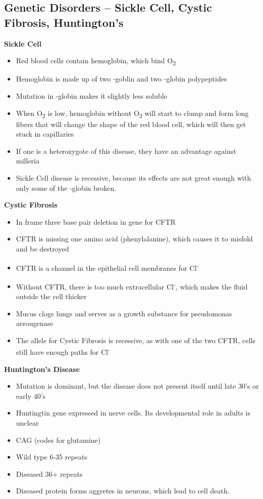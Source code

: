 \documentclass{article}
\begin{document}
\subsection{Genetic Disorders -- Sickle Cell, Cystic Fibrosis, Huntington's}
\textbf{Sickle Cell}
\begin{itemize}
\item Red blood cells contain hemoglobin, which bind O\textsubscript{2}
\item Hemoglobin is made up of two \textalpha -goblin and two \textbeta -globin polypeptides
\item Mutation in \textbeta -globin makes it slightly less soluble
\item When O\textsubscript{2} is low, hemoglobin without O\textsubscript{2} will start to
clump and form long fibers that will change the shape of the red blood cell, which will then get stuck in capillaries
\item If one is a heterozygote of this disease, they have an advantage against milleria
\item Sickle Cell disease is recessive, because its effects are not great enough with only some of the \textbeta -globin broken.
\end{itemize}

\textbf{Cystic Fibrosis}
\begin{itemize}
\item In frame three base pair deletion in gene for CFTR
\item CFTR is missing one amino acid (phenylalanine), which causes it to misfold and be
destroyed
\item CFTR is a channel in the epithelial cell membranes for Cl\textsuperscript{-}
\item Without CFTR, there is too much extracellular Cl\textsuperscript{-}, which makes the fluid outside the cell thicker
\item Mucus clogs lungs and serves as a growth substance for pseudomonas aerougenase
\item The allele for Cystic Fibrosis is recessive, as with one of the two CFTR, cells still have enough paths for Cl\textsuperscript{-}
\end{itemize}

\textbf{Huntington's Disease}
\begin{itemize}
\item Mutation is dominant, but the disease does not present itself until late 30's or early 40's
\item Huntingtin gene expressed in nerve cells. Its developmental role in adults is unclear
\item CAG (codes for glutamine)
\item Wild type 6-35 repeats
\item Diseased 36+ repeats
\item Diseased protein forms aggretes in neurons, which lead to cell death.
\end{itemize}
\end{document}
